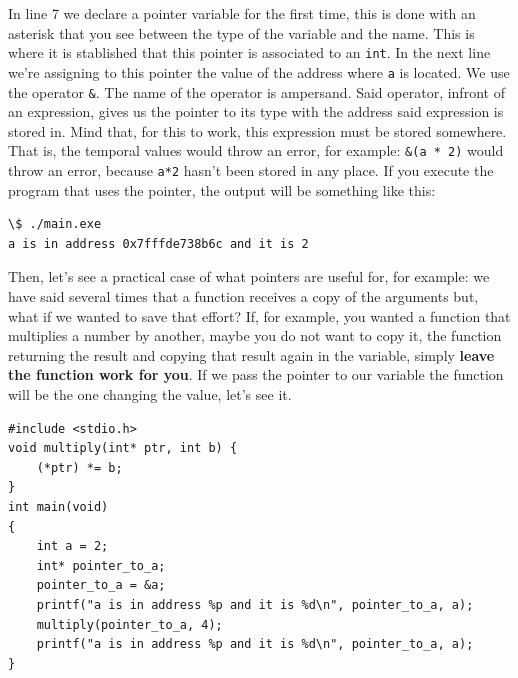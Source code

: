\documentclass[a4paper]{article}
\begin{document}
In line 7 we declare a pointer variable for the first time, this is done with
an asterisk that you see between the type of the variable and the name. This is
where it is stablished that this pointer is associated to an \texttt{int}. In
the next line we're assigning to this pointer the value of the address where
\verb!a! is located. We use the operator \verb!&!. The name of the operator
is ampersand. Said operator, infront of an expression, gives us the pointer to
its type with the address said expression is stored in. Mind that, for this to
work, this expression must be stored somewhere. That is, the temporal values
would throw an error, for example: \verb!&(a * 2)! would throw an error, because
\verb!a*2! hasn't been stored in any place. If you execute the program that uses
the pointer, the output will be something like this:

\noindent
\begin{minipage}[H]{\linewidth}
\mbox{}
\begin{lstlisting}[style=terminalStyle]
\$ ./main.exe
a is in address 0x7fffde738b6c and it is 2
\end{lstlisting}
\end{minipage}

Then, let's see a practical case of what pointers are useful for, for example:
we have said several times that a function receives a copy of the arguments but,
what if we wanted to save that effort? If, for example, you wanted a function
that multiplies a number by another, maybe you do not want to copy it, the
function returning the result and copying that result again in the variable,
simply \textbf{leave the function work for you}. If we pass the pointer to our
variable the function will be the one changing the value, let's see it.

\noindent
\begin{minipage}[H]{\linewidth}
\mbox{}
\begin{lstlisting}[style=C, label={lst:pointers1},
caption={Pointer ussage example}]
#include <stdio.h>
void multiply(int* ptr, int b) {
    (*ptr) *= b;
}
int main(void)
{
    int a = 2;
    int* pointer_to_a;
    pointer_to_a = &a;
    printf("a is in address %p and it is %d\n", pointer_to_a, a);
    multiply(pointer_to_a, 4);
    printf("a is in address %p and it is %d\n", pointer_to_a, a);
}
\end{lstlisting}
\end{minipage}
\end{document}
